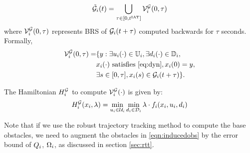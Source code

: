 \begin{equation} \label{eqn:inducedobs}
\tilde\obsset_i(t) = \bigcup_{\tau \in [0, \iat]} \brs^{\mathcal{G}}_{i}(0, \tau)
\end{equation}
where $\mathcal{V}^{\mathcal{G}}_{i}(0, \tau)$ represents BRS of $\mathcal{G}_i(t+\tau)$ computed backwards for $\tau$ seconds. Formally, 
\begin{equation} \label{eqn:inducedobs_help1}
\begin{aligned}
\brs^{\mathcal{G}}_{i}(0, \tau) = & \{y: \exists \ctrl_i(\cdot) \in \cfset_i, \exists \dstb_i(\cdot) \in \dfset_i, \\
& \state_i(\cdot) \text{ satisfies \eqref{eq:dyn}}, \state_i(0) = y, \\
& \exists s \in [0, \tau], \state_i(s) \in \obsset_i(t + \tau)\}.
\end{aligned}
\end{equation}

The Hamiltonian $H^{\mathcal{G}}_{i}$ to compute $\mathcal{V}^{\mathcal{G}}_{i}(\cdot)$ is given by:
\begin{equation} \label{eqn:BRS_obsham}
\ham^{\mathcal{G}}_{i}(\state_i, \costate) = \min_{\ctrl_i \in \cset_i} \min_{\dstb_i \in \dset_i} \costate \cdot f_i (\state_i, \ctrl_i, \dstb_i)
\end{equation}

\begin{remark}
Note that if we use the robust trajectory tracking method to compute the base obstacles, we need to augment the obstacles in \eqref{eqn:inducedobs} by the error bound of $Q_i$, $\Omega_i$, as discussed in section \ref{sec:rtt}.
\end{remark}

